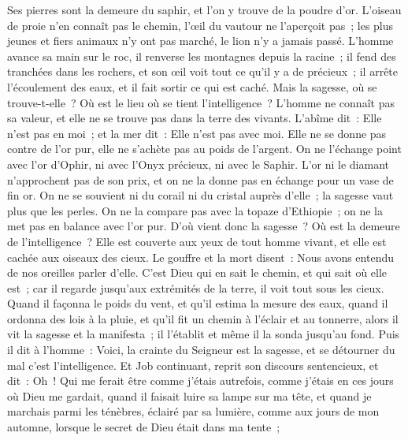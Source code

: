 \begin{multicols}{2}
Ses pierres sont la demeure du saphir, et l'on y trouve de la poudre d'or.
L'oiseau de proie n'en connaît pas le chemin, l'œil du vautour ne l'aperçoit pas~;
les plus jeunes et fiers animaux n'y ont pas marché, le lion n'y a jamais passé.
L'homme avance sa main sur le roc, il renverse les montagnes depuis la racine~;
il fend des tranchées dans les rochers, et son œil voit tout ce qu'il y a de précieux~;
il arrête l'écoulement des eaux, et il fait sortir ce qui est caché.
Mais la sagesse, où se trouve-t-elle~? Où est le lieu où se tient l'intelligence~?
L'homme ne connaît pas sa valeur, et elle ne se trouve pas dans la terre des vivants.
L'abîme dit~: Elle n'est pas en moi~; et la mer dit~: Elle n'est pas avec moi.
Elle ne se donne pas contre de l'or pur, elle ne s'achète pas au poids de l'argent.
On ne l'échange point avec l'or d'Ophir, ni avec l'Onyx précieux, ni avec le Saphir.
L'or ni le diamant n'approchent pas de son prix, et on ne la donne pas en échange pour un vase de fin or.
On ne se souvient ni du corail ni du cristal auprès d'elle~; la sagesse vaut plus que les perles.
On ne la compare pas avec la topaze d'Ethiopie~; on ne la met pas en balance avec l'or pur.
D'où vient donc la sagesse~? Où est la demeure de l'intelligence~?
Elle est couverte aux yeux de tout homme vivant, et elle est cachée aux oiseaux des cieux.
Le gouffre et la mort disent~: Nous avons entendu de nos oreilles parler d'elle.
C'est Dieu qui en sait le chemin, et qui sait où elle est~;
car il regarde jusqu'aux extrémités de la terre, il voit tout sous les cieux.
Quand il façonna le poids du vent, et qu'il estima la mesure des eaux,
quand il ordonna des lois à la pluie, et qu'il fit un chemin à l'éclair et au tonnerre,
alors il vit la sagesse et la manifesta~; il l'établit et même il la sonda jusqu'au fond.
Puis il dit à l'homme~: Voici, la crainte du Seigneur est la sagesse, et se détourner du mal c'est l'intelligence.
\VerseOne{} Et Job continuant, reprit son discours sentencieux, et dit~:
Oh~! Qui me ferait être comme j'étais autrefois, comme j'étais en ces jours où Dieu me gardait,
quand il faisait luire sa lampe sur ma tête, et quand je marchais parmi les ténèbres, éclairé par sa lumière,
comme aux jours de mon automne, lorsque le secret de Dieu était dans ma tente~;

\end{multicols}
